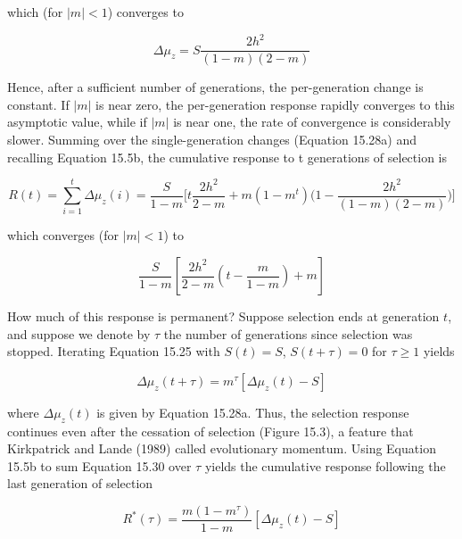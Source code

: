 \documentclass{article}
\begin{document}
which (for  $ |m|<1 $) converges to

\begin{equation}
\Delta\mu_{z}=S\frac{2h^{2}}{(1-m)(2-m)}
\tag{15.28b}
\label{eq:15_28b}
\end{equation}

Hence, after a sufficient number of generations, the per-generation change is constant. If  $ |m| $ is near zero, the per-generation response rapidly converges to this asymptotic value, while if  $ |m| $ is near one, the rate of convergence is considerably slower. Summing over the single-generation changes (Equation 15.28a) and recalling Equation 15.5b, the cumulative response to t generations of selection is

\begin{equation}
R(t)=\sum_{i=1}^{t}\Delta\mu_{z}(i)=\frac{S}{1-m}\bigg[t\frac{2h^{2}}{2-m}+m\left(1-m^{t}\right)\bigg(1-\frac{2h^{2}}{(1-m)(2-m)}\bigg)\bigg]
\tag{15.29a}
\label{eq:15_29a}
\end{equation}

which converges (for  $ |m|<1 $) to

\begin{equation}
\frac{S}{1-m}\left[\frac{2h^{2}}{2-m}\left(t-\frac{m}{1-m}\right)+m\right]
\tag{15.29b}
\label{eq:15_29b}
\end{equation}

How much of this response is permanent? Suppose selection ends at generation  $ t $, and suppose we denote by  $ \tau $ the number of generations since selection was stopped. Iterating Equation 15.25 with  $ S(t) = S $,  $ S(t + \tau) = 0 $ for  $ \tau \geq 1 $ yields

\begin{equation}
\Delta\mu_{z}(t+\tau)=m^{\tau}\left[\Delta\mu_{z}(t)-S\right]
\tag{15.30}
\label{eq:15_30}
\end{equation}

where  $ \Delta\mu_{z}(t) $ is given by Equation 15.28a. Thus, the selection response continues even after the cessation of selection (Figure 15.3), a feature that Kirkpatrick and Lande (1989) called evolutionary momentum. Using Equation 15.5b to sum Equation 15.30 over  $ \tau $ yields the cumulative response following the last generation of selection

\begin{equation}
R^{*}(\tau)=\frac{m(1-m^{\tau})}{1-m}\left[\Delta\mu_{z}(t)-S\right]
\tag{15.31}
\label{eq:15_31}
\end{equation}
\end{document}
